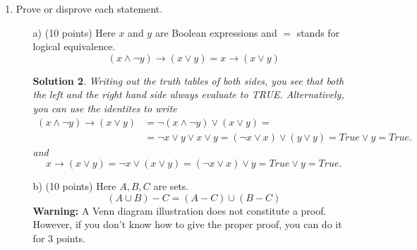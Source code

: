 \documentclass[12pt]{article}
\newtheorem*{solution}{Solution}
\begin{document}
\begin{enumerate}
\begin{solution}
\begin{enumerate}
\item The number $a\cdot b\cdot c$ is odd only if all three of $a$, $b$, and $c$ are odd. This gives four numbers to choose from: $1,3,5,7$. The number of lists of length $3$ you can make out of four elements is
\[
(4)_3=4\cdot 3\cdot 2\cdot 1= 24.
\]
\item When we are looking at a set, all we need to do is identify those lists from part (a), that only differ in the order of the elements.  Under this equivalence relation, every equivalence class has $3!$ elements, we have to divide the number in part (a) by $3!$ to get
\[
\frac{24}{3!}=4.
\]
Alternatively, you can argue that we are choosing $3$ elements out of $4$ and therefore the answer is $\binom{4}{3}$ which is, of course, again $4$.
\end{enumerate}
\end{solution}

\begin{itemize}
\item The average score on this problem was $10.64$.
\item Some of you interpreted $abc$ instead as a three digit number. I accepted this interpretation as well.
\item In part (b), I also accepted if somebody just listed the sets correctly.
\item Some people did not know the binomial formula correctly. That is not good.
\item Some people didn't read the part where it said \textbf{different}. Try to avoid such unforced mistakes in the future.
\end{itemize}
\newpage
\item Prove or disprove each statement.
\begin{itemize}
\item[a)] (10 points) Here $x$ and $y$ are Boolean expressions and $=$ stands for logical equivalence.
\[
(x\wedge\neg y) \to (x\vee y) = x\to (x\vee y)
\]

\begin{solution}
Writing out the truth tables of both sides, you see that both the left and the right hand side always evaluate to TRUE. Alternatively, you can use the identites to write
\begin{align*}
(x\wedge\neg y)\to (x\vee y)&=\neg(x\wedge\neg y)\vee (x\vee y)=\\
&=\neg x\vee y\vee x\vee y=(\neg x\vee x)\vee (y\vee y)=True\vee y=True.
\end{align*}
and
\[
x\to(x\vee y)=\neg x\vee(x\vee y)=(\neg x\vee x)\vee y=True\vee y=True.
\]
\end{solution}
\item[b)] (10 points) Here $A,B,C$ are sets. 
\[
(A\cup B)-C=(A-C)\cup (B-C)
\]
\textbf{Warning:} A Venn diagram illustration does not constitute a proof. However, if you don't know how to give the proper proof, you can do it for 3 points.


\end{itemize}
\end{enumerate}
\end{document}
